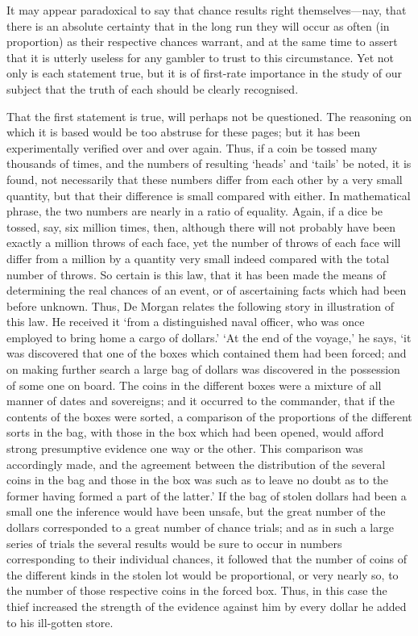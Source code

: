 \documentclass[letterpaper,12pt,oneside,openany]{memoir}
\begin{document}
It may appear paradoxical to say that chance results
right themselves---nay, that there is an absolute
certainty that in the long run they will occur as often
(in proportion) as their respective chances warrant,
and at the same time to assert that it is utterly
useless for any gambler to trust to this circumstance.
Yet not only is each statement true, but it is of first-rate
importance in the study of our subject that the
truth of each should be clearly recognised.

That the first statement is true, will perhaps not be
questioned. The reasoning on which it is based would
be too abstruse for these pages; but it has been experimentally
verified over and over again. Thus, if a coin
be tossed many thousands of times, and the numbers
of resulting `heads' and `tails' be noted, it is found,
not necessarily that these numbers differ from each
other by a very small quantity, but that their difference
is small compared with either. In mathematical phrase,
the two numbers are nearly in a ratio of equality. Again,
if a dice be tossed, say, six million times, then, although
there will not probably have been exactly a million
throws of each face, yet the number of throws of each
face will differ from a million by a quantity very small
indeed compared with the total number of throws. So
certain is this law, that it has been made the means of
determining the real chances of an event, or of ascertaining
facts which had been before unknown. Thus, De
Morgan relates the following story in illustration of
this law. He received it `from a distinguished naval
officer, who was once employed to bring home a cargo
of dollars.' `At the end of the voyage,' he says, `it
was discovered that one of the boxes which contained
them had been forced; and on making further search
a large bag of dollars was discovered in the possession
of some one on board. The coins in the different
boxes were a mixture of all manner of dates and sovereigns;
and it occurred to the commander, that if the
contents of the boxes were sorted, a comparison of the
proportions of the different sorts in the bag, with those
in the box which had been opened, would afford strong
presumptive evidence one way or the other. This
comparison was accordingly made, and the agreement
between the distribution of the several coins in the bag
and those in the box was such as to leave no doubt as
to the former having formed a part of the latter.' If
the bag of stolen dollars had been a small one the
inference would have been unsafe, but the great number
of the dollars corresponded to a great number of chance
trials; and as in such a large series of trials the several
results would be sure to occur in numbers corresponding
to their individual chances, it followed that the number
of coins of the different kinds in the stolen lot would
be proportional, or very nearly so, to the number of
those respective coins in the forced box. Thus, in this
case the thief increased the strength of the evidence
against him by every dollar he added to his ill-gotten
store.
\end{document}
